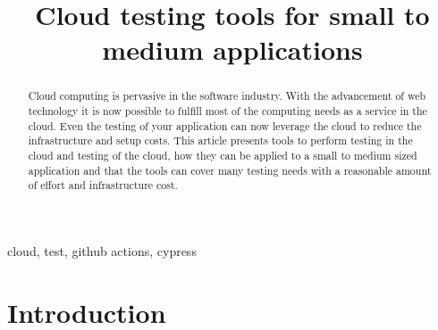 \documentclass[conference]{IEEEtran}
\begin{document}
\title{Cloud testing tools for small to medium applications}

\author{
}

\maketitle

\begin{abstract}
	Cloud computing is pervasive in the software industry.
	With the advancement of web technology it is now possible to fulfill most of the computing needs as a service
	in the cloud.
	Even the testing of your application can now leverage the cloud to reduce the infrastructure and setup costs.
	This article presents tools to perform testing in the cloud and testing of the cloud, how they can
	be applied to a small to medium sized application and that the tools can cover many testing needs with a reasonable
	amount of effort and infrastructure cost.
\end{abstract}

\begin{IEEEkeywords}
	cloud, test, github actions, cypress
\end{IEEEkeywords}

\section{Introduction}
\end{document}
